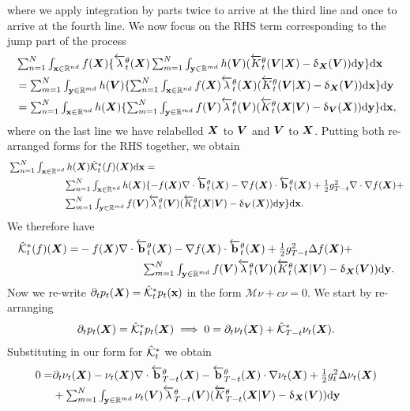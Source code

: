 where we apply integration by parts twice to arrive at the third line and once to arrive at the fourth line. We now focus on the RHS term corresponding to the jump part of the process
\begin{align}
    &\textstyle \sum_{n=1}^N \int_{{\mathbf{x}} \in \mathbb{R}^{nd}} f({\bm{X}}) \{ \overleftarrow{\lambda}_t^\theta({\bm{X}}) \sum_{m=1}^N \int_{\mathbf{y} \in \mathbb{R}^{md}} h({\bm{V}}) ( \overleftarrow{K}_t^\theta({\bm{V}} | {\bm{X}}) - \updelta_{{\bm{X}}}({\bm{V}}) ) \mathrm{d} \mathbf{y} \} \mathrm{d} {\mathbf{x}} \\
    &\textstyle =\sum_{m=1}^N \int_{\mathbf{y} \in \mathbb{R}^{md}} h({\bm{V}}) \{ \sum_{n=1}^N \int_{{\mathbf{x}} \in \mathbb{R}^{nd}} f({\bm{X}}) \overleftarrow{\lambda}_t^\theta({\bm{X}}) ( \overleftarrow{K}_t^\theta({\bm{V}} | {\bm{X}}) - \updelta_{{\bm{X}}}({\bm{V}}) ) \mathrm{d} {\mathbf{x}} \} \mathrm{d} \mathbf{y}\\
    &\textstyle =\sum_{n=1}^N \int_{{\mathbf{x}} \in \mathbb{R}^{nd}} h({\bm{X}}) \{ \sum_{m=1}^N \int_{\mathbf{y} \in \mathbb{R}^{md}} f({\bm{V}}) \overleftarrow{\lambda}_t^\theta({\bm{V}}) ( \overleftarrow{K}_t^\theta({\bm{X}} | {\bm{V}}) - \updelta_{{\bm{V}}}({\bm{X}}) ) \mathrm{d} \mathbf{y} \} \mathrm{d} {\mathbf{x}} , 
\end{align}
where on the last line we have relabelled ${\bm{X}}$ to ${\bm{V}}$ and ${\bm{V}}$ to ${\bm{X}}$. Putting both re-arranged forms for the RHS together, we obtain
\begin{align}
    &\textstyle \sum_{n=1}^N \int_{{\mathbf{x}} \in \mathbb{R}^{nd}} h({\bm{X}}) \hat{\mathcal{K}}_t^*(f)({\bm{X}}) \mathrm{d} {\mathbf{x}}  = \\
    &\textstyle \hspace{2cm} \sum_{n=1}^N \int_{{\mathbf{x}} \in \mathbb{R}^{nd}} h({\bm{X}}) \{ -f({\bm{X}}) \nabla \cdot \overleftarrow{\mathbf{b}}_t^\theta({\bm{X}}) - \nabla f({\bm{X}}) \cdot \overleftarrow{\mathbf{b}}_t^\theta({\bm{X}}) + \frac{1}{2} g_{T-t}^2 \nabla \cdot \nabla f ({\bm{X}}) + \\
    &\textstyle  \hspace{2cm} \sum_{m=1}^N \int_{\mathbf{y} \in \mathbb{R}^{md}} f({\bm{V}}) \overleftarrow{\lambda}_t^\theta({\bm{V}}) ( \overleftarrow{K}_t^\theta({\bm{X}} | {\bm{V}}) - \updelta_{{\bm{V}}}({\bm{X}}) ) \mathrm{d} \mathbf{y}  \} \mathrm{d} {\mathbf{x}} . 
\end{align}
We therefore have
\begin{align}
    \hat{\mathcal{K}}^*_t(f)({\bm{X}}) =&\textstyle   -f({\bm{X}}) \nabla \cdot \overleftarrow{\mathbf{b}}_t^\theta({\bm{X}}) - \nabla f({\bm{X}}) \cdot \overleftarrow{\mathbf{b}}_t^\theta({\bm{X}}) + \frac{1}{2} g_{T-t}^2 \Delta f({\bm{X}}) + \\
    &\textstyle  \hspace{2cm} \sum_{m=1}^N \int_{\mathbf{y} \in \mathbb{R}^{md}} f({\bm{V}}) \overleftarrow{\lambda}_t^\theta({\bm{V}}) ( \overleftarrow{K}_t^\theta({\bm{X}} | {\bm{V}}) - \updelta_{{\bm{X}}}({\bm{V}}) ) \mathrm{d} \mathbf{y} . 
\end{align}
Now we re-write $\partial_t p_t({\bm{X}}) = \hat{\mathcal{K}}^*_t p_t({\mathbf{x}})$ in the form $\mathcal{M}\nu + c \nu = 0$. We start by re-arranging
\begin{equation}
\partial_t p_t({\bm{X}}) = \hat{\mathcal{K}}^*_t p_t({\bm{X}}) \implies 0 = \partial_t \nu_t({\bm{X}}) + \hat{\mathcal{K}}^*_{T-t} \nu_t({\bm{X}}) . 
\end{equation}
Substituting in our form for $\hat{\mathcal{K}}^*_t$ we obtain
\begin{align}
    0 = &\textstyle \partial_t \nu_t(\mX) -  \nu_t(\mX) \nabla \cdot \backwarddrift_{T-t}^\theta(\mX) - \backwarddrift_{T-t}^\theta(\mX) \cdot \nabla \nu_t(\mX) + \frac{1}{2}g_{t}^2 \Delta \nu_t(\mX)\\
    &\textstyle  + \inty \nu_t(\mV) \backwardrate_{T-t}^\theta(\mV) ( \btk_{T-t}^\theta(\mX | \mV) - \updelta_{\mX}(\mV) ) \rmd\y
\label{eq:assm1LHS}
\end{align}

